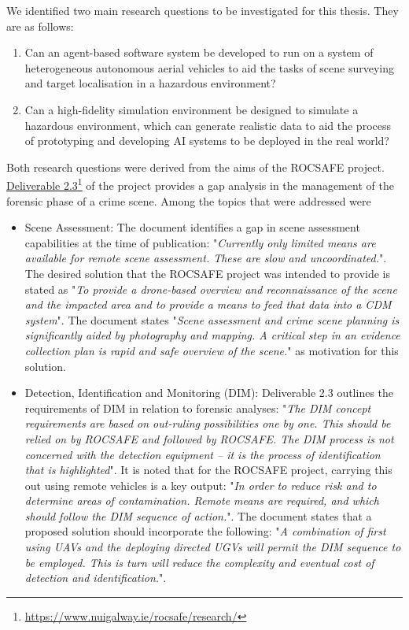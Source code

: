 We identified two main research questions to be investigated for this thesis. They are as follows:
\begin{enumerate}

    \item Can an agent-based software system be developed to run on a system of heterogeneous autonomous aerial vehicles to aid the tasks of scene surveying and target localisation in a hazardous environment? 
    
    \item Can a high-fidelity simulation environment be designed to simulate a hazardous environment, which can generate realistic data to aid the process of prototyping and developing AI systems to be deployed in the real world?
    
\end{enumerate}

Both research questions were derived from the aims of the ROCSAFE project. \href{https://www.nuigalway.ie/rocsafe/research/}{Deliverable 2.3}\footnote{\href {https://www.nuigalway.ie/rocsafe/research/}{https://www.nuigalway.ie/rocsafe/research/}} of the project provides a gap analysis in the management of the forensic phase of a crime scene. 
Among the topics that were addressed were
\begin{itemize}
    \item Scene Assessment: The document identifies a gap in scene assessment capabilities at the time of publication: 
"\textit{Currently only limited means are available for remote scene assessment. These are slow and uncoordinated.}". The desired solution that the ROCSAFE project was intended to provide is stated as "\textit{To provide a drone-based overview and reconnaissance of the scene and the impacted area and to provide a means to feed that data into a CDM system}". The document states "\textit{Scene assessment and crime scene planning is significantly aided by photography and mapping.  A critical step in an evidence collection plan is rapid and safe overview of the scene.}" as motivation for this solution.

    \item Detection, Identification and Monitoring (DIM): Deliverable 2.3 outlines the requirements of DIM in relation to forensic analyses:
    "\textit{The DIM concept requirements are based on out-ruling possibilities one by one. This should be relied on by ROCSAFE and followed by ROCSAFE. The DIM process is not concerned with the detection equipment – it is the process of identification that is highlighted}". It is noted that for the ROCSAFE project, carrying this out using remote vehicles is a key output: "\textit{In order to reduce risk and to determine areas of contamination. Remote means are required, and which should follow the DIM sequence of action.}". The document states that a proposed solution should incorporate the following: "\textit{A combination of first using UAVs and the deploying directed UGVs will permit the DIM sequence to be employed. This is turn will reduce the complexity and eventual cost of detection and identification.}".
\end{itemize}

